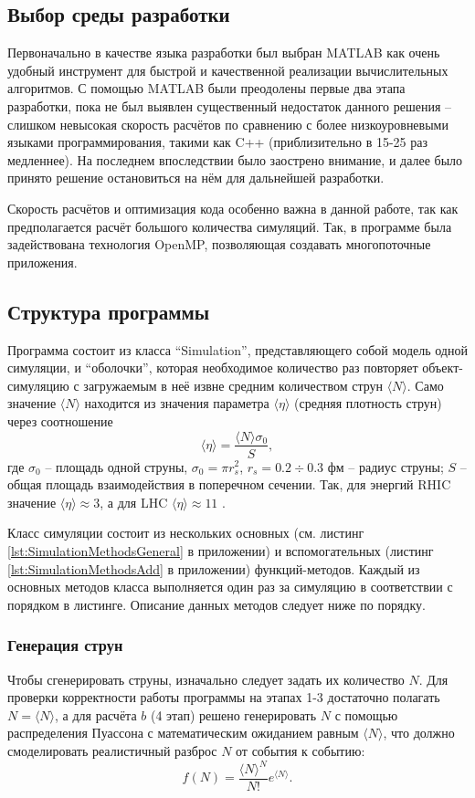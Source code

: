 \subsection{Выбор среды разработки}
Первоначально в качестве языка разработки был выбран MATLAB как очень удобный инструмент для быстрой и качественной реализации вычислительных алгоритмов. С помощью MATLAB были преодолены первые два этапа разработки, пока не был выявлен существенный недостаток данного решения -- слишком невысокая скорость расчётов по сравнению с более низкоуровневыми языками программирования, такими как C++ (приблизительно в 15-25 раз медленнее). На последнем впоследствии было заострено внимание, и далее было принято решение остановиться на нём для дальнейшей разработки. 

Скорость расчётов и оптимизация кода особенно важна в данной работе, так как предполагается расчёт большого количества симуляций. Так, в программе была задействована технология OpenMP, позволяющая создавать многопоточные приложения. 
\subsection{Структура программы}
Программа состоит из класса ``Simulation'', представляющего собой модель одной симуляции, и ``оболочки'', которая необходимое количество раз повторяет объект-симуляцию с загружаемым в неё извне средним количеством струн $\langle N \rangle$. Само значение $\langle N \rangle$ находится из значения параметра $\langle \eta \rangle$ (средняя плотность струн) через соотношение 
\begin{equation} \label{eq:eta}
	\langle \eta \rangle = \frac{\langle N \rangle \sigma_0}{S},
\end{equation}
где $\sigma_0$ -- площадь одной струны, $\sigma_0 = \pi r_s^2$, $r_s = 0.2 \div 0.3$ фм -- радиус струны; $S$ -- общая площадь взаимодействия в поперечном сечении.
Так, для энергий RHIC значение $\langle \eta \rangle \approx 3$, а для LHC $\langle \eta \rangle \approx 11$ \cite{RHICandLHC}. 

Класс симуляции состоит из нескольких основных (см. листинг \ref{lst:SimulationMethodsGeneral} в приложении) и вспомогательных (листинг \ref{lst:SimulationMethodsAdd} в приложении) функций-методов. Каждый из основных методов класса выполняется один раз за симуляцию в соответствии с порядком в листинге. Описание данных методов следует ниже по порядку.
\subsubsection{Генерация струн}
Чтобы сгенерировать струны, изначально следует задать их количество $N$. 
Для проверки корректности работы программы на этапах 1-3 достаточно полагать $N = \langle N \rangle$, а для расчёта $b$ (4 этап) решено генерировать $N$ с помощью распределения Пуассона с математическим ожиданием равным $\langle N \rangle$, что должно смоделировать реалистичный разброс $N$ от события к событию:
\begin{equation} \label{eq:poisson}
	f(N) = \frac{\langle N \rangle ^ N}{N!} e^{\langle N \rangle}.
\end{equation}

